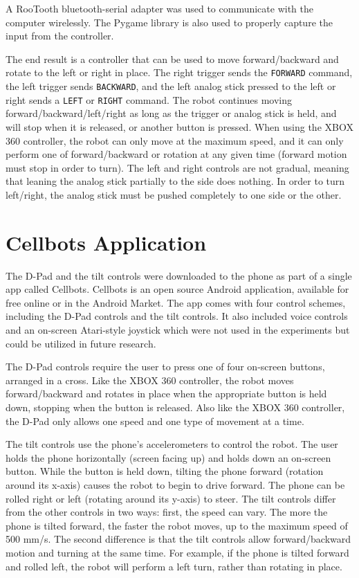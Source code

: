 \documentclass[12pt,a4paper]{report}
\begin{document}
A RooTooth bluetooth-serial adapter was used to communicate with the computer wirelessly. The Pygame library is also used to properly capture the input from the controller. 

The end result is a controller that can be used to move forward/backward and rotate to the left or right in place. The right trigger sends the \texttt{FORWARD} command, the left trigger sends \texttt{BACKWARD}, and the left analog stick pressed to the left or right sends a \texttt{LEFT} or \texttt{RIGHT} command. The robot continues moving forward/backward/left/right as long as the trigger or analog stick is held, and will stop when it is released, or another button is pressed. When using the XBOX 360 controller, the robot can only move at the maximum speed, and it can only perform one of forward/backward or rotation at any given time (forward motion must stop in order to turn). The left and right controls are not gradual, meaning that leaning the analog stick partially to the side does nothing. In order to turn left/right, the analog stick must be pushed completely to one side or the other.

\section{Cellbots Application}
The D-Pad and the tilt controls were downloaded to the phone as part of a single app called Cellbots. Cellbots is an open source Android application, available for free online or in the Android Market. The app comes with four control schemes, including the D-Pad controls and the tilt controls. It also included voice controls and an on-screen Atari-style joystick which were not used in the experiments but could be utilized in future research.

The D-Pad controls require the user to press one of four on-screen buttons, arranged in a cross. Like the XBOX 360 controller, the robot moves forward/backward and rotates in place when the appropriate button is held down, stopping when the button is released. Also like the XBOX 360 controller, the D-Pad only allows one speed and one type of movement at a time.

The tilt controls use the phone's accelerometers to control the robot. The user holds the phone horizontally (screen facing up) and holds down an on-screen button. While the button is held down, tilting the phone forward (rotation around its x-axis) causes the robot to begin to drive forward. The phone can be rolled right or left (rotating around its y-axis) to steer. 
The tilt controls differ from the other controls in two ways: first, the speed can vary. The more the phone is tilted forward, the faster the robot moves, up to the maximum speed of 500 mm/s.  The second difference is that the tilt controls allow forward/backward motion and turning at the same time. For example, if the phone is tilted forward and rolled left, the robot will perform a left turn, rather than rotating in place.
\end{document}
